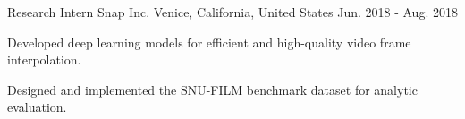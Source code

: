 \begin{cventries}
  \cventry
    {Research Intern} %
    {Snap Inc.} %
    {Venice, California, United States} %
    {Jun. 2018 - Aug. 2018} %
    {
      \begin{cvitems} %
        \item {Developed deep learning models for efficient and high-quality video frame interpolation.}
        \item {Designed and implemented the SNU-FILM benchmark dataset for analytic evaluation.}
      \end{cvitems}
    }

\end{cventries}